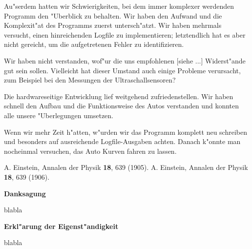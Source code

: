 \documentclass[a4paper,12pt]{article}
\begin{document}
Au"serdem hatten wir Schwierigkeiten, bei dem immer komplexer werdenden Programm den "Uberblick zu behalten.
Wir haben den Aufwand und die Komplexit"at des Programms zuerst untersch"atzt.
Wir haben mehrmals versucht, einen hinreichenden Logfile zu implementieren; letztendlich hat es aber nicht gereicht, um die aufgetretenen Fehler zu identifizieren.

Wir haben nicht verstanden, wof"ur die uns empfohlenen [siehe ...] Widerst"ande gut sein sollen.
Vielleicht hat dieser Umstand auch einige Probleme verursacht, zum Beispiel bei den Messungen der Ultraschallsensoren?

Die hardwareseitige Entwicklung lief weitgehend zufriedenstellen.
Wir haben schnell den Aufbau und die Funktionsweise des Autos verstanden und konnten alle unsere "Uberlegungen umsetzen.

Wenn wir mehr Zeit h"atten, w"urden wir das Programm komplett neu schreiben und besonders auf ausreichende Logfile-Ausgaben achten.
Danach k"onnte man nocheinmal versuchen, das Auto Kurven fahren zu lassen.

\bigskip


\begin{thebibliography}{99}
	\itemsep-2pt \small
	 A. Einstein, Annalen der Physik {\bf 18}, 639 (1905).
	 A. Einstein, Annalen der Physik {\bf 18}, 639 (1906).
\end{thebibliography}

\newpage


{\large\bf Danksagung}

\medskip

blabla

\bigskip


{\large\bf Erkl"arung der Eigenst"andigkeit}

\medskip

blabla
\end{document}
